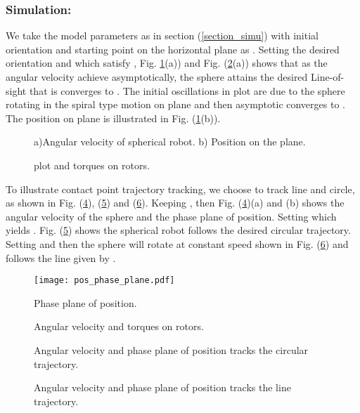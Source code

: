 \documentclass{ifacconf}
\begin{document}
\subsubsection*{Simulation:}
We take the model parameters as in section (\ref{section_simu}) with initial orientation  and starting point on the horizontal plane as . Setting the desired orientation  and  which satisfy , Fig. \ref{position_track1}(a)) and Fig. (\ref{fig:gam}(a)) shows that as the angular velocity achieve  asymptotically, the sphere attains the desired Line-of-sight that is  converges to . The initial oscillations in  plot are due to the sphere rotating in the spiral type motion on plane and then asymptotic converges to . The position on  plane is illustrated in Fig. (\ref{position_track1}(b)).
\begin{figure}[h]
\centering
		\caption{a)Angular velocity of spherical robot. b) Position on the plane.}				
		\label{position_track1}				
\end{figure}
\begin{figure}[h]
\centering
			\caption{  plot and torques on rotors.}				
				\label{fig:gam}
\end{figure}
To illustrate contact point trajectory tracking, we choose  to track line and circle, as shown in Fig. (\ref{fig:5}), (\ref{fig:6}) and (\ref{fig:7}). Keeping , then Fig. (\ref{fig:5})(a) and (b) shows the angular velocity of the sphere and the phase plane of position. Setting  which yields . Fig. (\ref{fig:6}) shows the spherical robot follows the desired circular trajectory. Setting  and  then the sphere will rotate at constant speed shown in Fig. (\ref{fig:7}) and follows the line given by .
\begin{figure}[h]
\centering
\texttt{[image: pos\_phase\_plane.pdf]}
\caption{Phase plane of  position.}			
\label{fig:4}
\end{figure}
\begin{figure}[h]
\centering
\caption{Angular velocity and torques on rotors.}				
\label{fig:5}
\end{figure}
\begin{figure}[h]
\centering
\caption{Angular velocity and phase plane of  position tracks the circular trajectory.}			
\label{fig:6}
\end{figure}
\begin{figure}[h]
\centering
\caption{Angular velocity and phase plane of  position tracks the line trajectory.}			
\label{fig:7}
\end{figure}
\end{document}
